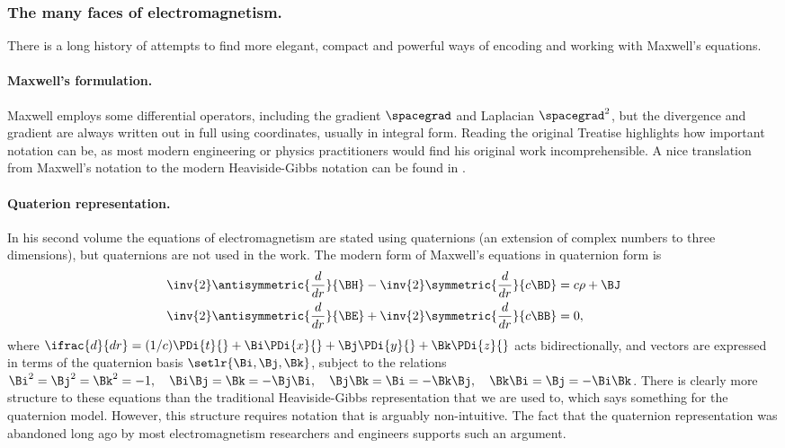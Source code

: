 %
%
\subsubsection{The many faces of electromagnetism.}

There is a long history of attempts to find more elegant, compact and powerful ways of encoding and working with Maxwell's equations.

\paragraph{Maxwell's formulation.}
Maxwell
\citep{maxwell1881treatiseVolumeI}
employs some differential operators, including the
gradient \( \spacegrad \) and Laplacian \( \spacegrad^2 \), but the divergence and gradient
are always written out in full using coordinates, usually in integral form.
Reading the original Treatise highlights how important notation can be, as
most modern engineering or physics practitioners would find his original work incomprehensible.
A nice translation from Maxwell's notation to the modern Heaviside-Gibbs notation can be found in
\citep{chappell2014geometricAppendixA}.

\paragraph{Quaterion representation.}
In his second volume
\citep{maxwell1881treatiseVolumeII} the equations of electromagnetism are stated
using quaternions (an extension of complex numbers to three dimensions), but quaternions are not used in the work.
The modern form of Maxwell's equations in quaternion form is
\begin{dmath}\label{eqn:manyfaces:220}
\begin{aligned}
\inv{2} \antisymmetric{ \frac{d}{dr} }{ \BH } - \inv{2} \symmetric{ \frac{d}{dr} } { c \BD } &= c \rho + \BJ \\
\inv{2} \antisymmetric{ \frac{d}{dr} }{ \BE } + \inv{2} \symmetric{ \frac{d}{dr} }{ c \BB } &= 0,
\end{aligned}
\end{dmath}
where \( \ifrac{d}{dr} = (1/c) \PDi{t}{} + \Bi \PDi{x}{} + \Bj \PDi{y}{} + \Bk \PDi{z}{} \) \citep{jack2003physical} acts bidirectionally, and vectors are expressed in terms of the quaternion basis \( \setlr{ \Bi, \Bj, \Bk } \), subject to the relations \(
\Bi^2 = \Bj^2 = \Bk^2 = -1, \quad
\Bi \Bj = \Bk = -\Bj \Bi, \quad
\Bj \Bk = \Bi = -\Bk \Bj, \quad
\Bk \Bi = \Bj = -\Bi \Bk \).
There is clearly more structure to these equations than the traditional Heaviside-Gibbs representation that we are used to, which says something for the quaternion model.
However, this structure requires notation that is arguably non-intuitive.
The
fact that the quaternion representation was abandoned long ago by most electromagnetism researchers and engineers supports such an argument.

